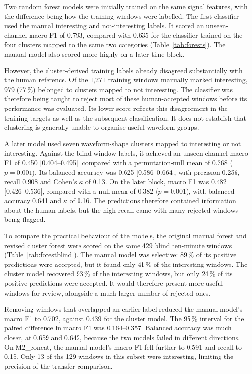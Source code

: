 Two random forest models were initially trained on the same signal features, with the difference being how the training windows were labelled. The first classifier used the manual interesting and not-interesting labels. It scored an unseen-channel macro F1 of 0.793, compared with 0.635 for the classifier trained on the four clusters mapped to the same two categories (Table~\ref{tab:forests}). The manual model also scored more highly on a later time block.

However, the cluster-derived training labels already disagreed substantially with the human reference. Of the 1,271 training windows manually marked interesting, 979 (77\,\%) belonged to clusters mapped to not interesting. The classifier was therefore being taught to reject most of these human-accepted windows before its performance was evaluated. Its lower score reflects this disagreement in the training targets as well as the subsequent classification. It does not establish that clustering is generally unable to organise useful waveform groups.

A later model used seven waveform-shape clusters mapped to interesting or not interesting. Against the blind window labels, it achieved an unseen-channel macro F1 of 0.450 [0.404--0.495], compared with a permutation-null mean of 0.368 ($p=0.001$). Its balanced accuracy was 0.625 [0.586--0.664], with precision 0.256, recall 0.908 and Cohen's $\kappa$ of 0.13. On the later block, macro F1 was 0.482 [0.426--0.536], compared with a null mean of 0.382 ($p=0.001$), with balanced accuracy 0.641 and $\kappa$ of 0.16. The predictions therefore contained information about the human labels, but the high recall came with many rejected windows being flagged.

To compare the practical behaviour of the models, the original manual forest and revised cluster forest were scored on the same 429 blind ten-minute windows (Table~\ref{tab:forestblind}). The manual model was selective: 89\,\% of its positive predictions were accepted, but it found only 41\,\% of the interesting windows. The cluster model recovered 93\,\% of the interesting windows, but only 24\,\% of its positive predictions were accepted. It would therefore present more useful windows for review, alongside a much larger number of rejected ones.

Removing windows that overlapped an earlier label reduced the manual model's macro F1 to 0.702, against 0.439 for the cluster model. The 95\,\% interval for the paired difference in macro F1 was 0.164--0.357. Balanced accuracy was much closer, at 0.659 and 0.642, because the two models failed in different directions. On M2\_concat, the manual model's macro F1 fell further to 0.591 and recall to 0.15. Only 13 of the 129 windows in this subset were interesting, limiting the precision of the transfer comparison.

